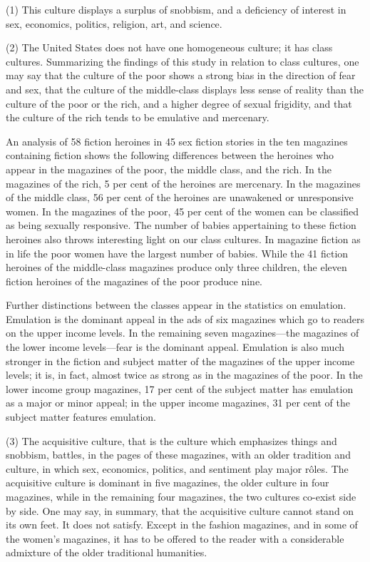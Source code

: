 \documentclass[nohyper,openany,nobib]{tufte-book}
\begin{document}
(1) This culture displays a surplus of snobbism, and a deficiency of
interest in sex, economics, politics, religion, art, and science.

(2) The United States does not have one homogeneous culture; it has
class cultures. Summarizing the findings of this study in relation to
class cultures, one may say that the culture of the poor shows a strong
bias in the direction of fear and sex, that the culture of the
middle-class displays less sense of reality than the culture of the poor
or the rich, and a higher degree of sexual frigidity, and that the
culture of the rich tends to be emulative and mercenary.

An analysis of 58 fiction heroines in 45 sex fiction stories in the ten
magazines containing fiction shows the following differences between the
heroines who appear in the magazines of the poor, the middle class, and
the rich. In the magazines of the rich, 5 per cent of the heroines are
mercenary. In the magazines of the middle class, 56 per cent of the
heroines are unawakened or unresponsive women. In the magazines of the
poor, 45 per cent of the women can be classified as being sexually
responsive. The number of babies appertaining to these fiction heroines
also throws interesting light on our class cultures. In magazine fiction
as in life the poor women have the largest number of babies. While the
41 fiction heroines of the middle-class magazines produce only three
children, the eleven fiction heroines of the magazines of the poor
produce nine.

Further distinctions between the classes appear in the statistics on
emulation. Emulation is the dominant appeal in the ads of six magazines
which go to readers on the upper income levels. In the remaining seven
magazines---the magazines of the lower income levels---fear is the
dominant appeal. Emulation is also much stronger in the fiction and
subject matter of the magazines of the upper income levels; it is, in
fact, almost twice as strong as in the magazines of the poor. In the
lower income group magazines, 17 per cent of the subject matter has
emulation as a major or minor appeal; in the upper income magazines, 31
per cent of the subject matter features emulation.

(3) The acquisitive culture, that is the culture which emphasizes things
and snobbism, battles, in the pages of these magazines, with an older
tradition and culture, in which sex, economics, politics, and sentiment
play major r\^oles. The acquisitive culture is dominant in five magazines,
the older culture in four magazines, while in the remaining four
magazines, the two cultures co-exist side by side. One may say, in
summary, that the acquisitive culture cannot stand on its own feet. It
does not satisfy. Except in the fashion magazines, and in some of the
women's magazines, it has to be offered to the reader with a
considerable admixture of the older traditional humanities.
\end{document}
